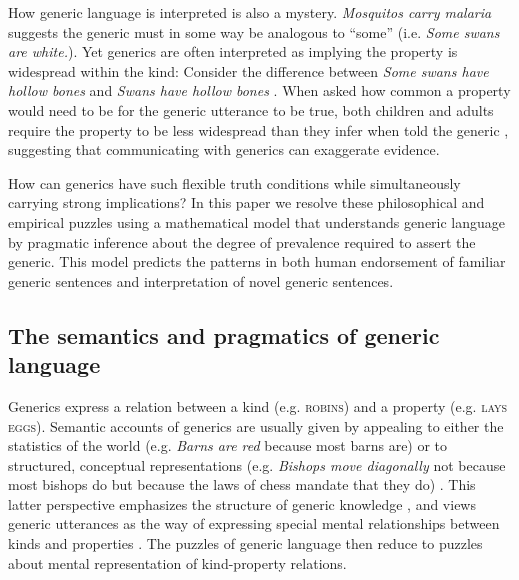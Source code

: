 \documentclass[12pt,letterpaper]{article}
\newcommand{\ndg}[1]{\textcolor{Green}{[ndg: #1]}}
\begin{document}

How generic language is interpreted is also a mystery.
\emph{Mosquitos carry malaria} suggests the generic must in some way be analogous to ``some'' (i.e. \emph{Some swans are white.}). 
Yet generics are often interpreted as implying the property is widespread within the kind:
Consider the difference between \emph{Some swans have hollow bones} and \emph{Swans have hollow bones} \cite{Gelman2002}.
When asked how common a property would need to be for the generic utterance to be true, both children and adults require the property to be less widespread than they infer when told the generic \cite{Cimpian2010,Brandone2014}, suggesting that communicating with generics can exaggerate evidence.

How can generics have such flexible truth conditions while simultaneously carrying strong implications?
In this paper we resolve these philosophical and empirical puzzles using a mathematical model that understands generic language by pragmatic inference about the degree of prevalence required to assert the generic.  
This model predicts the patterns in both human endorsement of familiar generic sentences and interpretation of novel generic sentences. 

\subsection*{The semantics and pragmatics of generic language}


Generics express a relation between a kind (e.g. \textsc{robins}) and a property (e.g. \textsc{lays eggs}). 
Semantic accounts of generics are usually given by appealing to either the statistics of the world (e.g. \emph{Barns are red} because most barns are) or to structured, conceptual representations (e.g. \emph{Bishops move diagonally} not because most bishops do but because the laws of chess mandate that they do) \cite{Carlson1995essay}. 
This latter perspective emphasizes the structure of generic knowledge \cite{Prasada2000}, and views generic utterances as the way of expressing special mental relationships between kinds and properties \cite{Leslie2008, Prasada2012}. The puzzles of generic language then reduce to puzzles about mental representation of kind-property relations.
\end{document}
